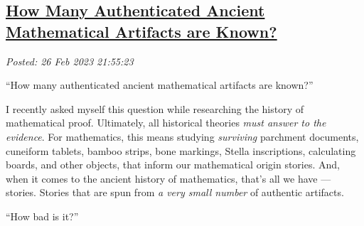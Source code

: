 %

%
%
%

\subsection*{\href{http://analyzethedatanotthedrivel.org/2023/02/26/how-many-authenticated-ancient-mathematical-artifacts-are-known/}{How Many Authenticated Ancient Mathematical Artifacts are Known?}}


\noindent\emph{Posted: 26 Feb 2023 21:55:23}
\vspace{6pt}

``How many authenticated ancient mathematical artifacts are known?''

I recently asked myself this question while researching the history of
mathematical proof. Ultimately, all historical theories \emph{must
answer to the evidence}. For mathematics, this means studying
\emph{surviving} parchment documents, cuneiform tablets, bamboo strips,
bone markings, Stella inscriptions, calculating boards, and other
objects, that inform our mathematical origin stories. And, when it comes
to the ancient history of mathematics, that's all we have --- stories.
Stories that are spun from \emph{a very small number} of authentic
artifacts.

``How bad is it?''

